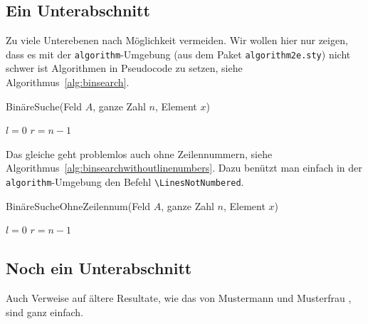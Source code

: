 \documentclass[a4paper]{scrreprt}
\theoremstyle{definition}
\begin{document}
\subsection{Ein Unterabschnitt}

Zu viele Unterebenen nach Möglichkeit vermeiden. Wir wollen hier nur
zeigen, dass es mit der \verb+algorithm+-Umgebung (aus dem Paket
\verb+algorithm2e.sty+) nicht schwer ist Algorithmen in Pseudocode zu
setzen, siehe Algorithmus~\ref{alg:binsearch}.

\begin{algorithm}[ht]
  \caption{BinäreSuche(Feld $A$, ganze Zahl $n$, Element $x$)}
  \label{alg:binsearch}
  
  $l = 0$ \;
  $r = n-1$ \;
  
  \Return \False
\end{algorithm}

Das gleiche geht problemlos auch ohne Zeilennummern, siehe
Algorithmus~\ref{alg:binsearchwithoutlinenumbers}.  Dazu benützt man
einfach in der \verb+algorithm+-Umgebung den Befehl
\verb+\LinesNotNumbered+.

\begin{algorithm}[ht]
  \LinesNotNumbered
  \caption{BinäreSucheOhneZeilennum(Feld $A$, ganze Zahl $n$, Element $x$)}
  \label{alg:binsearchwithoutlinenumbers}
  
  $l = 0$ \;
  $r = n-1$ \;
  
  \Return \False
\end{algorithm}

\subsection{Noch ein Unterabschnitt}

Auch Verweise auf ältere Resultate, wie das von Mustermann und
Musterfrau \cite{mustermann+etal-11}, sind ganz einfach.



\end{document}
